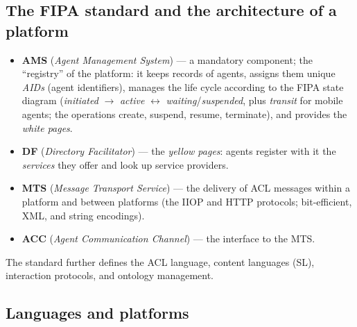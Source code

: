 \documentclass[11pt,a4paper]{article}
\theoremstyle{definition}
\providecommand{\uv}[1]{``#1''}
\begin{document}
\subsection{The FIPA standard and the architecture of a platform}
\begin{defbox}
\begin{itemize}
\item \textbf{AMS} (\emph{Agent Management System}) --- a mandatory component; the \uv{registry} of the
  platform: it keeps records of agents, assigns them unique \emph{AIDs} (agent identifiers),
  manages the life cycle according to the FIPA state diagram (\emph{initiated} $\to$
  \emph{active} $\leftrightarrow$ \emph{waiting}/\emph{suspended}, plus \emph{transit} for
  mobile agents; the operations create, suspend, resume, terminate), and provides the
  \emph{white pages}.
\item \textbf{DF} (\emph{Directory Facilitator}) --- the \emph{yellow pages}:
  agents register with it the \emph{services} they offer and look up service providers.
\item \textbf{MTS} (\emph{Message Transport Service}) --- the delivery of ACL messages within a
  platform and between platforms (the IIOP and HTTP protocols; bit-efficient, XML, and string
  encodings).
\item \textbf{ACC} (\emph{Agent Communication Channel}) --- the interface to the MTS.
\end{itemize}
The standard further defines the ACL language, content languages (SL), interaction protocols, and
ontology management.
\end{defbox}

\subsection{Languages and platforms}
\end{document}

